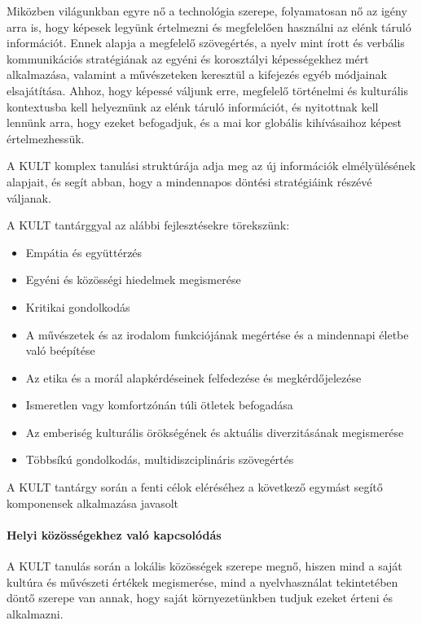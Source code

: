 Miközben világunkban egyre nő a technológia szerepe, folyamatosan nő az igény arra is, hogy képesek legyünk értelmezni és megfelelően használni az elénk táruló információt. Ennek alapja a megfelelő szövegértés, a nyelv mint írott és verbális kommunikációs stratégiának az egyéni és korosztályi képességekhez mért alkalmazása, valamint a művészeteken keresztül a kifejezés egyéb módjainak elsajátítása. Ahhoz, hogy képessé váljunk erre, megfelelő történelmi és kulturális kontextusba kell helyeznünk az elénk táruló információt, és nyitottnak kell lennünk arra, hogy ezeket befogadjuk, és a mai kor globális kihívásaihoz képest értelmezhessük.

A KULT komplex tanulási struktúrája adja meg az új információk elmélyülésének alapjait, és segít abban, hogy a mindennapos döntési stratégiáink részévé váljanak.

A KULT tantárggyal az alábbi fejlesztésekre törekszünk:
\begin{itemize}
\item Empátia és együttérzés

\item Egyéni és közösségi hiedelmek megismerése

\item Kritikai gondolkodás

\item A művészetek és az irodalom funkciójának megértése és a mindennapi életbe való beépítése

\item Az etika és a morál alapkérdéseinek felfedezése és megkérdőjelezése

\item Ismeretlen vagy komfortzónán túli ötletek befogadása

\item Az emberiség kulturális örökségének és aktuális diverzitásának megismerése

\item Többsíkú gondolkodás, multidiszciplináris szövegértés
\end{itemize}

A KULT tantárgy során a fenti célok eléréséhez a következő egymást segítő komponensek alkalmazása javasolt

\paragraph{Helyi közösségekhez való kapcsolódás}

A KULT tanulás során a lokális közösségek szerepe megnő, hiszen mind a saját kultúra és művészeti értékek megismerése, mind a nyelvhasználat tekintetében döntő szerepe van annak, hogy saját környezetünkben  tudjuk ezeket érteni és alkalmazni.

